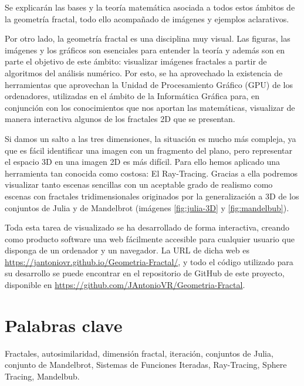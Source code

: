 Se explicarán las bases y la teoría matemática asociada a todos estos ámbitos de la geometría fractal, todo ello acompañado de imágenes y ejemplos aclarativos.

Por otro lado, la geometría fractal es una disciplina muy visual. Las figuras, las imágenes y los gráficos son esenciales para entender la teoría y además son en parte el objetivo de este ámbito: visualizar imágenes fractales a partir de algoritmos del análisis numérico. Por esto, se ha aprovechado la existencia de herramientas que aprovechan la Unidad de Procesamiento Gráfico (GPU) de los ordenadores, utilizadas en el ámbito de la Informática Gráfica para, en conjunción con los conocimientos que nos aportan las matemáticas, visualizar de manera interactiva algunos de los fractales 2D que se presentan. 

Si damos un salto a las tres dimensiones, la situación es mucho más compleja, ya que es fácil identificar una imagen con un fragmento del plano, pero representar el espacio 3D en una imagen 2D es más difícil. Para ello hemos aplicado una herramienta tan conocida como costosa: El Ray-Tracing. Gracias a ella podremos visualizar tanto escenas sencillas con un aceptable grado de realismo como escenas con fractales tridimensionales originados por la generalización a 3D de los conjuntos de Julia y de Mandelbrot (imágenes \ref{fig:julia-3D} y \ref{fig:mandelbub}).

Toda esta tarea de visualizado se ha desarrollado de forma interactiva, creando como producto software una web fácilmente accesible para cualquier usuario que disponga de un ordenador y un navegador. La URL de dicha web es \url{https://jantoniovr.github.io/Geometria-Fractal/}, y todo el código utilizado para su desarrollo se puede encontrar en el repositorio de GitHub de este proyecto, disponible en \url{https://github.com/JAntonioVR/Geometria-Fractal}.

\section*{Palabras clave}

Fractales, autosimilaridad, dimensión fractal, iteración, conjuntos de Julia, conjunto de Mandelbrot, Sistemas de Funciones Iteradas, Ray-Tracing, Sphere Tracing, Mandelbub. 
